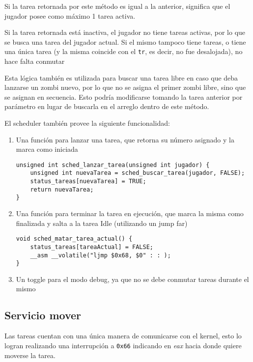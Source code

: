    Si la tarea retornada por este método es igual a la anterior, significa que el jugador posee como máximo 1 tarea activa.

    Si la tarea retornada está inactiva, el jugador no tiene tareas activas, por lo que se busca una tarea del jugador actual. Si el mismo tampoco tiene tareas, o tiene una única tarea (y la misma coincide con el \texttt{tr}, es decir, no fue desalojada), no hace falta conmutar

    Esta lógica también es utilizada para buscar una tarea libre en caso que deba lanzarse un zombi nuevo, por lo que no se asigna el primer zombi libre, sino que se asignan en secuencia. Esto podría modificarse tomando la tarea anterior por parámetro en lugar de buscarla en el arreglo dentro de este método.

    El scheduler también provee la siguiente funcionalidad:

    \begin{enumerate}

        \item Una función para lanzar una tarea, que retorna su número asignado y la marca como iniciada

        \begin{lstlisting}
unsigned int sched_lanzar_tarea(unsigned int jugador) {
    unsigned int nuevaTarea = sched_buscar_tarea(jugador, FALSE);
    status_tareas[nuevaTarea] = TRUE;
    return nuevaTarea;
}
        \end{lstlisting}

        \item Una función para terminar la tarea en ejecución, que marca la misma como finalizada y salta a la tarea Idle (utilizando un jump far)

        \begin{lstlisting}
void sched_matar_tarea_actual() {
    status_tareas[tareaActual] = FALSE;
    __asm __volatile("ljmp $0x68, $0" : : );
}
        \end{lstlisting}

        \item Un toggle para el modo debug, ya que no se debe conmutar tareas durante el mismo


    \end{enumerate}

	\subsection{Servicio mover}
	Las tareas cuentan con una única manera de comunicarse con el kernel, esto lo logran realizando una interrupción a \texttt{0x66} indicando en \textit{eax} hacia donde quiere moverse la tarea.

